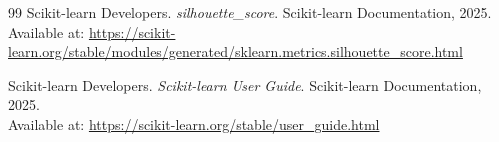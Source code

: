 \documentclass[oneside, a4paper]{book}
\theoremstyle{plain}
\theoremstyle{plain}
\theoremstyle{remark}
\theoremstyle{definition}
\theoremstyle{remark}
\begin{document}
{\begin{thebibliography}{99}
			Scikit-learn Developers.
			\textit{silhouette\_score}.
			Scikit-learn Documentation, 2025.\\
			Available at: \url{https://scikit-learn.org/stable/modules/generated/sklearn.metrics.silhouette_score.html}
			
			Scikit-learn Developers.
			\textit{Scikit-learn User Guide}.
			Scikit-learn Documentation, 2025.\\
			Available at: \url{https://scikit-learn.org/stable/user_guide.html}
			
		\end{thebibliography}
	}
	
\end{document}
